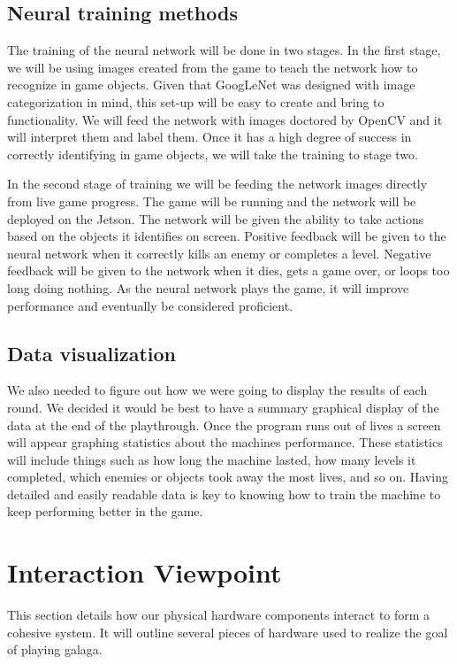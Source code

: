 \documentclass{scrreprt}
\begin{document}
\subsection{Neural training methods}%

The training of the neural network will be done in two stages.
In the first stage, we will be using images created from the game to teach the network how to recognize in game objects.
Given that GoogLeNet was designed with image categorization in mind, this set-up will be easy to create and bring to functionality.
We will feed the network with images doctored by OpenCV and it will interpret them and label them.
Once it has a high degree of success in correctly identifying in game objects, we will take the training to stage two.

In the second stage of training we will be feeding the network images directly from live game progress.
The game will be running and the network will be deployed on the Jetson.
The network will be given the ability to take actions based on the objects it identifies on screen.
Positive feedback will be given to the neural network when it correctly kills an enemy or completes a level.
Negative feedback will be given to the network when it dies, gets a game over, or loops too long doing nothing.
As the neural network plays the game, it will improve performance and eventually be considered proficient.

\subsection{Data visualization}%

We also needed to figure out how we were going to display the results of each round.
We decided it would be best to have a summary graphical display of the data at the end of the playthrough.
Once the program runs out of lives a screen will appear graphing statistics about the machines performance.
These statistics will include things such as how long the machine lasted, how many levels it completed, which enemies or objects took away the most lives, and so on.
Having detailed and easily readable data is key to knowing how to train the machine to keep performing better in the game.

\section{Interaction Viewpoint}%

This section details how our physical hardware components interact to form a cohesive system.
It will outline several pieces of hardware used to realize the goal of playing galaga.
\end{document}
